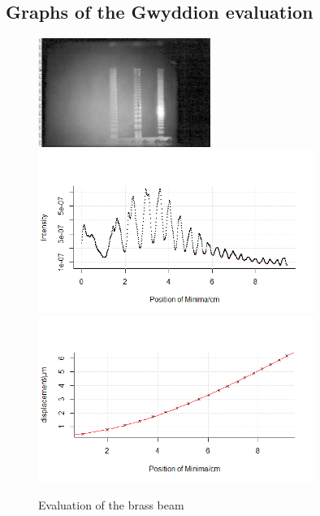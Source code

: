 \subsection{Graphs of the Gwyddion evaluation}
\label{gwyddion}
\begin{figure}
	\centering
	\includegraphics[width=0.5\textwidth]{../figures/Stab3gwid.png}
	\includegraphics[width=0.8\textwidth]{../figures/Stab3R1.png}
	\includegraphics[width=0.8\textwidth]{../figures/Stab3R2.png}
	\caption{Evaluation of the brass beam}
\end{figure}
